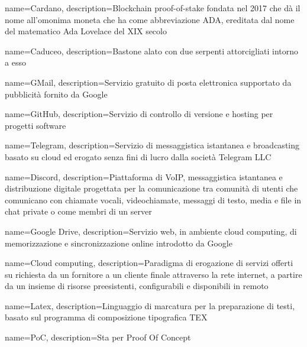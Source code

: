 {
	name={Cardano},
	description={Blockchain proof-of-stake fondata nel 2017 che dà il nome all’omonima moneta che ha come abbreviazione ADA, ereditata dal nome del matematico Ada Lovelace del XIX secolo}
}

{
	name={Caduceo},
	description={Bastone alato con due serpenti attorcigliati intorno a esso}
}

{
	name={GMail},
	description={Servizio gratuito di posta elettronica supportato da pubblicità fornito da Google}
}

{
	name={GitHub},
	description={Servizio di controllo di versione e hosting per progetti software}
}

{
	name={Telegram},
	description={Servizio di messaggistica istantanea e broadcasting basato su cloud ed erogato senza fini di lucro dalla società Telegram LLC}
}

{
	name={Discord},
	description={Piattaforma di VoIP, messaggistica istantanea e distribuzione digitale progettata per la comunicazione tra comunità di utenti che comunicano con chiamate vocali, videochiamate, messaggi di testo, media e file in chat private o come membri di un server}
}

{
	name={Google Drive},
	description={Servizio web, in ambiente cloud computing\glo, di memorizzazione e sincronizzazione online introdotto da Google}
}

{
	name={Cloud computing},
	description={Paradigma di erogazione di servizi offerti su richiesta da un fornitore a un cliente finale attraverso la rete internet, a partire da un insieme di risorse preesistenti, configurabili e disponibili in remoto}
}

{
	name={Latex},
	description={Linguaggio di marcatura per la preparazione di testi, basato sul programma di composizione tipografica TEX}
}

{
	name={PoC},
	description={Sta per Proof Of Concept\glo}
}

